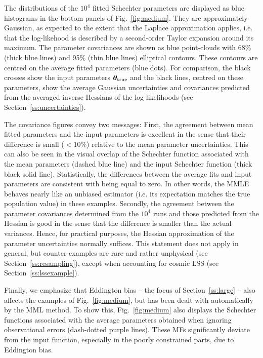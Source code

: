 \documentclass[a4paper,fleqn,usenatbib]{mnras}
\newcommand{\fig}[1]{Fig.~\ref{fig:#1}}
\renewcommand{\ss}[1]{Section~\ref{ss:#1}}
\newcommand{\ie}{i.e.\xspace}
\newcommand{\para}{{\bm{\theta}}}
\begin{document}
The distributions of the $10^4$ fitted Schechter parameters are displayed as blue histograms in the bottom panels of \fig{medium}. They are approximately Gaussian, as expected to the extent that the Laplace approximation applies, \ie that the log-likehood is described by a second-order Taylor expansion around its maximum. The parameter covariances are shown as blue point-clouds with 68\% (thick blue lines) and 95\% (thin blue lines) elliptical contours. These contours are centred on the average fitted parameters (blue dots). For comparison, the black crosses show the input parameters $\para_{\rm true}$ and the black lines, centred on these parameters, show the average Gaussian uncertainties and covariances predicted from the averaged inverse Hessians of the log-likelihoods (see \ss{uncertainties}).

The covariance figures convey two messages: First, the agreement between mean fitted parameters and the input parameters is excellent in the sense that their difference is small ($<10\%$) relative to the mean parameter uncertainties. This can also be seen in the visual overlap of the Schechter function associated with the mean parameters (dashed blue line) and the input Schechter function (thick black solid line). Statistically, the differences between the average fits and input parameters are consistent with being equal to zero. In other words, the MMLE behaves nearly like an unbiased estimator (\ie its expectation matches the true population value) in these examples. Secondly, the agreement between the parameter covariances determined from the $10^4$ runs and those predicted from the Hessian is good in the sense that the difference is smaller than the actual variances. Hence, for practical purposes, the Hessian approximation of the parameter uncertainties normally suffices. This statement does not apply in general, but counter-examples are rare and rather unphysical (see \ss{resampling}), except when accounting for cosmic LSS (see \ss{lssexample}).

Finally, we emphasize that Eddington bias -- the focus of \ss{large} -- also affects the examples of \fig{medium}, but has been dealt with automatically by the MML method. To show this, \fig{medium} also displays the Schechter functions associated with the average parameters obtained when ignoring observational errors (dash-dotted purple lines). These MFs significantly deviate from the input function, especially in the poorly constrained parts, due to Eddington bias.
\end{document}
